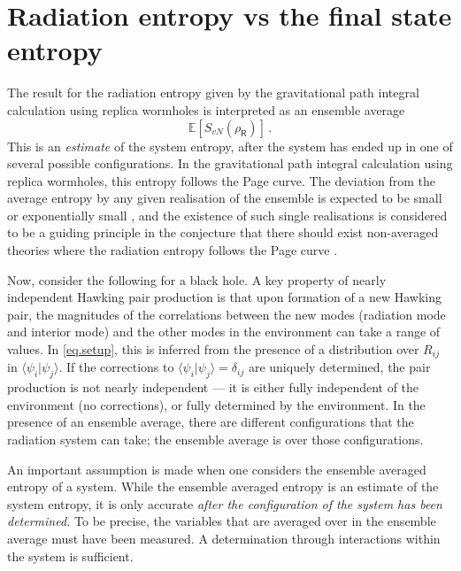 \documentclass[11pt]{article}
\def\be{\begin{equation}}
\def\ee{\end{equation}}
\numberwithin{equation}{section}
\begin{document}
\section{Radiation entropy vs the final state entropy}\label{s.ent}
The result for the radiation entropy given by the gravitational path integral calculation using replica wormholes is interpreted as an ensemble average
\be\label{eq.estS}
\mathbb{E}\left[S_{vN}(\rho_\textsf{R})\right]\,.
\ee
This is an \emph{estimate} of the system entropy, after the system has ended up in one of several possible configurations. In the gravitational path integral calculation using replica wormholes, this entropy follows the Page curve. The deviation from the average entropy by any given realisation of the ensemble is expected to be small \cite{Penington:2019kki} or exponentially small \cite{Marolf:2020rpm}, and the existence of such single realisations is considered to be a guiding principle \cite{Penington:2019kki} in the conjecture that there should exist non-averaged theories where the radiation entropy follows the Page curve \cite{Penington:2019kki,Almheiri:2019qdq}.

Now, consider the following for a black hole. A key property of nearly independent Hawking pair production is that upon formation of a new Hawking pair, the magnitudes of the correlations between the new modes (radiation mode and interior mode) and the other modes in the environment can take a range of values. In \eqref{eq.setup}, this is inferred from the presence of a distribution over $R_{ij}$ in $\langle \psi_i|\psi_j\rangle$. If the corrections to $\langle \psi_i|\psi_j\rangle=\delta_{ij}$ are uniquely determined, the pair production is not nearly independent --- it is either fully independent of the environment (no corrections), or fully determined by the environment. In the presence of an ensemble average, there are different configurations that the radiation system can take; the ensemble average is over those configurations.

An important assumption is made when one considers the ensemble averaged entropy of a system. While the ensemble averaged entropy is an estimate of the system entropy, it is only accurate {\it after the configuration of the system has been determined.} To be precise, the variables that are averaged over in the ensemble average must have been measured. A determination through interactions within the system is sufficient.
\end{document}
